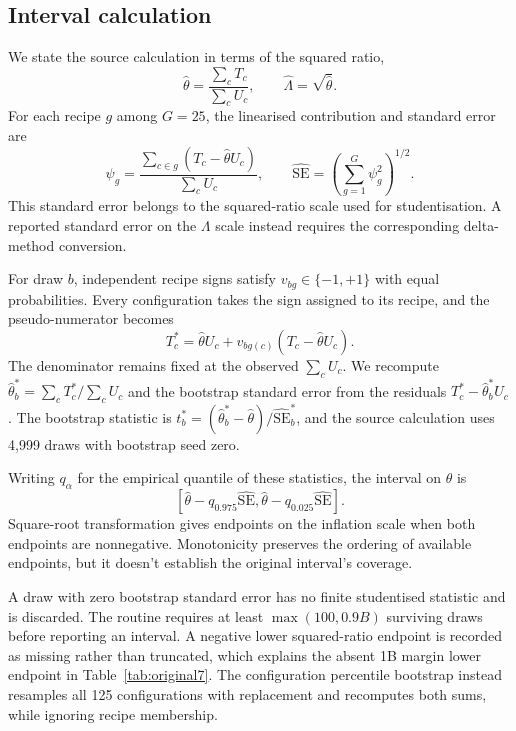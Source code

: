 \subsection{Interval calculation}
We state the source calculation in terms of the squared ratio,
\[
\widehat\theta=\frac{\sum_cT_c}{\sum_cU_c},\qquad
\widehat\Lambda=\sqrt{\widehat\theta}.
\]
For each recipe $g$ among $G=25$, the linearised contribution and standard error are
\begin{equation}
\psi_g=\frac{\sum_{c\in g}(T_c-\widehat\theta U_c)}{\sum_cU_c},
\qquad
\widehat{\mathrm{SE}}=\left(\sum_{g=1}^{G}\psi_g^2\right)^{1/2}.
\label{eq:bootstrap}
\end{equation}
This standard error belongs to the squared-ratio scale used for studentisation. A reported standard error on the $\Lambda$ scale instead requires the corresponding delta-method conversion.

For draw $b$, independent recipe signs satisfy $v_{bg}\in\{-1,+1\}$ with equal probabilities. Every configuration takes the sign assigned to its recipe, and the pseudo-numerator becomes
\[
T_c^*=\widehat\theta U_c+v_{bg(c)}(T_c-\widehat\theta U_c).
\]
The denominator remains fixed at the observed $\sum_cU_c$. We recompute $\widehat\theta_b^*=\sum_cT_c^*/\sum_cU_c$ and the bootstrap standard error from the residuals $T_c^*-\widehat\theta_b^*U_c$. The bootstrap statistic is $t_b^*=(\widehat\theta_b^*-\widehat\theta)/\widehat{\mathrm{SE}}_b^*$, and the source calculation uses 4,999 draws with bootstrap seed zero.

Writing $q_\alpha$ for the empirical quantile of these statistics, the interval on $\theta$ is
\[
\left[\widehat\theta-q_{0.975}\widehat{\mathrm{SE}},
\widehat\theta-q_{0.025}\widehat{\mathrm{SE}}\right].
\]
Square-root transformation gives endpoints on the inflation scale when both endpoints are nonnegative. Monotonicity preserves the ordering of available endpoints, but it doesn't establish the original interval's coverage.

A draw with zero bootstrap standard error has no finite studentised statistic and is discarded. The routine requires at least $\max(100,0.9B)$ surviving draws before reporting an interval. A negative lower squared-ratio endpoint is recorded as missing rather than truncated, which explains the absent 1B margin lower endpoint in Table~\ref{tab:original7}. The configuration percentile bootstrap instead resamples all 125 configurations with replacement and recomputes both sums, while ignoring recipe membership.


